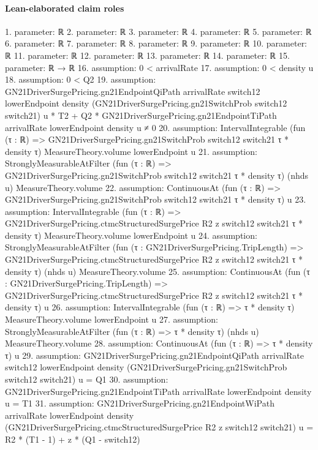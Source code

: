 \documentclass[10pt]{article}
\begin{document}
\paragraph{Lean-elaborated claim roles}\begin{ReviewVerbatim}
1. parameter: ℝ
2. parameter: ℝ
3. parameter: ℝ
4. parameter: ℝ
5. parameter: ℝ
6. parameter: ℝ
7. parameter: ℝ
8. parameter: ℝ
9. parameter: ℝ
10. parameter: ℝ
11. parameter: ℝ
12. parameter: ℝ
13. parameter: ℝ
14. parameter: ℝ
15. parameter: ℝ → ℝ
16. assumption: 0 < arrivalRate
17. assumption: 0 < density u
18. assumption: 0 < Q2
19. assumption: GN21DriverSurgePricing.gn21EndpointQiPath arrivalRate switch12 lowerEndpoint density
        (GN21DriverSurgePricing.gn21SwitchProb switch12 switch21) u *
      T2 +
    Q2 * GN21DriverSurgePricing.gn21EndpointTiPath arrivalRate lowerEndpoint density u ≠
  0
20. assumption: IntervalIntegrable (fun (τ : ℝ) => GN21DriverSurgePricing.gn21SwitchProb switch12 switch21 τ * density τ)
  MeasureTheory.volume lowerEndpoint u
21. assumption: StronglyMeasurableAtFilter (fun (τ : ℝ) => GN21DriverSurgePricing.gn21SwitchProb switch12 switch21 τ * density τ)
  (nhds u) MeasureTheory.volume
22. assumption: ContinuousAt (fun (τ : ℝ) => GN21DriverSurgePricing.gn21SwitchProb switch12 switch21 τ * density τ) u
23. assumption: IntervalIntegrable (fun (τ : ℝ) => GN21DriverSurgePricing.ctmcStructuredSurgePrice R2 z switch12 switch21 τ * density τ)
  MeasureTheory.volume lowerEndpoint u
24. assumption: StronglyMeasurableAtFilter
  (fun (τ : GN21DriverSurgePricing.TripLength) =>
    GN21DriverSurgePricing.ctmcStructuredSurgePrice R2 z switch12 switch21 τ * density τ)
  (nhds u) MeasureTheory.volume
25. assumption: ContinuousAt
  (fun (τ : GN21DriverSurgePricing.TripLength) =>
    GN21DriverSurgePricing.ctmcStructuredSurgePrice R2 z switch12 switch21 τ * density τ)
  u
26. assumption: IntervalIntegrable (fun (τ : ℝ) => τ * density τ) MeasureTheory.volume lowerEndpoint u
27. assumption: StronglyMeasurableAtFilter (fun (τ : ℝ) => τ * density τ) (nhds u) MeasureTheory.volume
28. assumption: ContinuousAt (fun (τ : ℝ) => τ * density τ) u
29. assumption: GN21DriverSurgePricing.gn21EndpointQiPath arrivalRate switch12 lowerEndpoint density
    (GN21DriverSurgePricing.gn21SwitchProb switch12 switch21) u =
  Q1
30. assumption: GN21DriverSurgePricing.gn21EndpointTiPath arrivalRate lowerEndpoint density u = T1
31. assumption: GN21DriverSurgePricing.gn21EndpointWiPath arrivalRate lowerEndpoint density
    (GN21DriverSurgePricing.ctmcStructuredSurgePrice R2 z switch12 switch21) u =
  R2 * (T1 - 1) + z * (Q1 - switch12)

\end{ReviewVerbatim}
\end{document}
